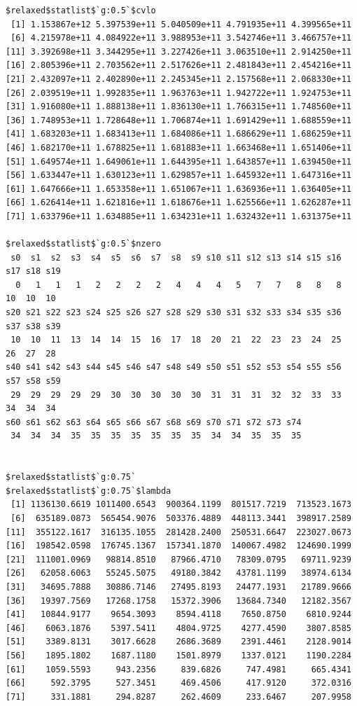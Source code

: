 \documentclass[
]{article}
\begin{document}
\begin{verbatim}
$relaxed$statlist$`g:0.5`$cvlo
 [1] 1.153867e+12 5.397539e+11 5.040509e+11 4.791935e+11 4.399565e+11
 [6] 4.215978e+11 4.084922e+11 3.988953e+11 3.542746e+11 3.466757e+11
[11] 3.392698e+11 3.344295e+11 3.227426e+11 3.063510e+11 2.914250e+11
[16] 2.805396e+11 2.703562e+11 2.517626e+11 2.481843e+11 2.454216e+11
[21] 2.432097e+11 2.402890e+11 2.245345e+11 2.157568e+11 2.068330e+11
[26] 2.039519e+11 1.992835e+11 1.963763e+11 1.942722e+11 1.924753e+11
[31] 1.916080e+11 1.888138e+11 1.836130e+11 1.766315e+11 1.748560e+11
[36] 1.748953e+11 1.728648e+11 1.706874e+11 1.691429e+11 1.688559e+11
[41] 1.683203e+11 1.683413e+11 1.684086e+11 1.686629e+11 1.686259e+11
[46] 1.682170e+11 1.678825e+11 1.681883e+11 1.663468e+11 1.651406e+11
[51] 1.649574e+11 1.649061e+11 1.644395e+11 1.643857e+11 1.639450e+11
[56] 1.633447e+11 1.630123e+11 1.629857e+11 1.645932e+11 1.647316e+11
[61] 1.647666e+11 1.653358e+11 1.651067e+11 1.636936e+11 1.636405e+11
[66] 1.626414e+11 1.621816e+11 1.618676e+11 1.625566e+11 1.626287e+11
[71] 1.633796e+11 1.634885e+11 1.634231e+11 1.632432e+11 1.631375e+11

$relaxed$statlist$`g:0.5`$nzero
 s0  s1  s2  s3  s4  s5  s6  s7  s8  s9 s10 s11 s12 s13 s14 s15 s16 s17 s18 s19 
  0   1   1   1   2   2   2   2   4   4   4   5   7   7   8   8   8  10  10  10 
s20 s21 s22 s23 s24 s25 s26 s27 s28 s29 s30 s31 s32 s33 s34 s35 s36 s37 s38 s39 
 10  10  11  13  14  14  15  16  17  18  20  21  22  23  23  24  25  26  27  28 
s40 s41 s42 s43 s44 s45 s46 s47 s48 s49 s50 s51 s52 s53 s54 s55 s56 s57 s58 s59 
 29  29  29  29  29  30  30  30  30  30  31  31  31  32  32  33  33  34  34  34 
s60 s61 s62 s63 s64 s65 s66 s67 s68 s69 s70 s71 s72 s73 s74 
 34  34  34  35  35  35  35  35  35  35  34  34  35  35  35 


$relaxed$statlist$`g:0.75`
$relaxed$statlist$`g:0.75`$lambda
 [1] 1136130.6619 1011400.6543  900364.1199  801517.7219  713523.1673
 [6]  635189.0873  565454.9076  503376.4889  448113.3441  398917.2589
[11]  355122.1617  316135.1055  281428.2400  250531.6647  223027.0673
[16]  198542.0598  176745.1367  157341.1870  140067.4982  124690.1999
[21]  111001.0969   98814.8510   87966.4710   78309.0795   69711.9239
[26]   62058.6063   55245.5075   49180.3842   43781.1199   38974.6134
[31]   34695.7888   30886.7146   27495.8193   24477.1931   21789.9666
[36]   19397.7569   17268.1758   15372.3906   13684.7340   12182.3567
[41]   10844.9177    9654.3093    8594.4118    7650.8750    6810.9244
[46]    6063.1876    5397.5411    4804.9725    4277.4590    3807.8585
[51]    3389.8131    3017.6628    2686.3689    2391.4461    2128.9014
[56]    1895.1802    1687.1180    1501.8979    1337.0121    1190.2284
[61]    1059.5593     943.2356     839.6826     747.4981     665.4341
[66]     592.3795     527.3451     469.4506     417.9120     372.0316
[71]     331.1881     294.8287     262.4609     233.6467     207.9958


\end{verbatim}
\end{document}
